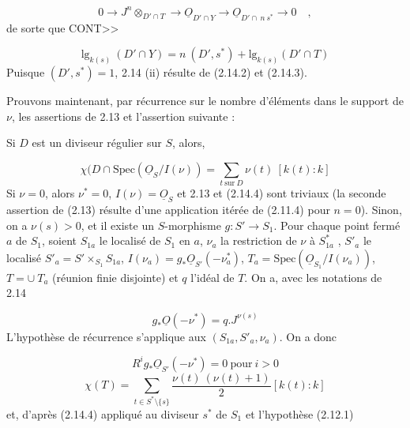 \begin{equation*}
0 \longrightarrow J^n \otimes_{D'\cap T} \longrightarrow \underline{O}_{D'\cap Y} \longrightarrow \underline{O}_{D'\cap\ n\ s^*} \longrightarrow 0 \quad ,
\end{equation*}
de sorte que CONT>>



\begin{equation}\tag{2.14.3}
\mathrm{lg}_{k(s)}\ (D' \cap Y) = n\ (D',s^*) + \mathrm{lg}_{k(s)}(D' \cap T)
\end{equation}
Puisque $(D',s^*) = 1$, 2.14 (ii) résulte de (2.14.2) et (2.14.3).

Prouvons maintenant, par récurrence sur le nombre d'éléments dans le support de $\nu$, les assertions de 2.13 et l'assertion suivante :

Si $D$ est un diviseur régulier sur $S$, alors,

\begin{equation*}
\chi(D \cap \mathrm{Spec}(\underline{O}_S/I(\nu)) = \sum_{t\ \mathrm{sur}\ D} \nu(t)\ [k(t) : k]
\end{equation*}
Si $\nu = 0$, alors $\nu^* = 0$, $I(\nu) = \underline{O}_S$ et 2.13 et (2.14.4) sont triviaux (la seconde assertion de (2.13) résulte d'une application itérée de (2.11.4) pour $n = 0$). Sinon, on a $\nu(s) > 0$, et il existe un $S$-morphisme $g : S' \longrightarrow S_1$. Pour chaque point fermé $a$ de $S_1$, soient $S_{1a}$ le localisé de $S_1$ en $a$, $\nu_a$ la restriction de $\nu$ à $S_{1a}^*$ , $S'_a$ le localisé $S'_a = S' \times_{S_1} S_{1a}$, $I(\nu_a) = g_* \underline{O}_{S'}(-\nu_a^*)$, $T_a = \mathrm{Spec}(\underline{O}_{S_1}/I(\nu_a))$, $T = \cup\ T_a$ (réunion finie disjointe) et $q$ l'idéal de $T$. On a, avec les notations de 2.14

\begin{equation}\tag{2.14.5}
g_* \underline{O}(-\nu^*) = q.J^{\nu(s)}
\end{equation}
L'hypothèse de récurrence s'applique aux $(S_{1a}, S'_a, \nu_a)$. On a donc

\begin{equation}\tag{2.14.6}
R^i g_* \underline{O}_{S'}(-\nu^*) = 0 \ \mathrm{pour}\ i > 0
\end{equation}
\begin{equation}\tag{2.14.7}
\chi(T) = \sum_{t \in S^* \setminus \{s\}} \frac{\nu(t)\ (\nu(t)+1)}{2} [k(t) : k]
\end{equation}
et, d'après (2.14.4) appliqué au diviseur $s^*$ de $S_1$ et l'hypothèse (2.12.1)

